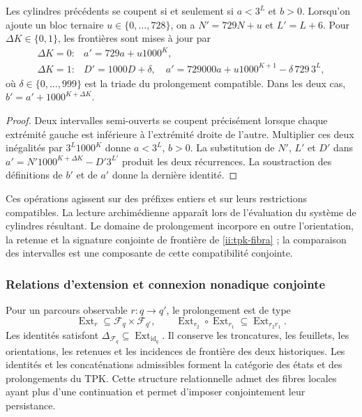 \begin{lemma}
\label{ii:tpk-cilindros-enteros}
Les cylindres précédents se coupent si et seulement si \(a<3^L\) et \(b>0\). Lorsqu'on ajoute un bloc ternaire \(u\in\{0,\ldots,728\}\), on a \(N'=729N+u\) et \(L'=L+6\). Pour \(\Delta K\in\{0,1\}\), les frontières sont mises à jour par
\[
 \begin{array}{ll}
 \Delta K=0:&a'=729a+u1000^K,\\[2pt]
 \Delta K=1:&D'=1000D+\delta,\quad
 a'=729000a+u1000^{K+1}-\delta\,729\,3^L,
 \end{array}
\]
où \(\delta\in\{0,\ldots,999\}\) est la triade du prolongement compatible. Dans les deux cas, \(b'=a'+1000^{K+\Delta K}\).
\end{lemma}
\begin{proof}
Deux intervalles semi-ouverts se coupent précisément lorsque chaque extrémité gauche est inférieure à l'extrémité droite de l'autre. Multiplier ces deux inégalités par \(3^L1000^K\) donne \(a<3^L\), \(b>0\). La substitution de \(N'\), \(L'\) et \(D'\) dans \(a'=N'1000^{K+\Delta K}-D'3^{L'}\) produit les deux récurrences. La soustraction des définitions de \(b'\) et de \(a'\) donne la dernière identité.
\end{proof}

Ces opérations agissent sur des préfixes entiers et sur leurs restrictions compatibles. La lecture archimédienne apparaît lors de l'évaluation du système de cylindres résultant. Le domaine de prolongement incorpore en outre l'orientation, la retenue et la signature conjointe de frontière de \eqref{ii:tpk-fibra} ; la comparaison des intervalles est une composante de cette compatibilité conjointe.

\subsubsection{Relations d'extension et connexion nonadique conjointe}

Pour un parcours observable \(r:q\to q'\), le prolongement est de type
\[
 \operatorname{Ext}_r\subseteq\mathcal F_q\times\mathcal F_{q'},
 \qquad
 \operatorname{Ext}_{r_2}\circ\operatorname{Ext}_{r_1}
 \subseteq\operatorname{Ext}_{r_2r_1}.
\]
Les identités satisfont \(\Delta_{\mathcal F_q}\subseteq
\operatorname{Ext}_{\operatorname{id}_q}\). Il conserve les troncatures, les feuillets, les orientations, les retenues et les incidences de frontière des deux historiques. Les identités et les concaténations admissibles forment la catégorie des états et des prolongements du TPK. Cette structure relationnelle admet des fibres locales ayant plus d'une continuation et permet d'imposer conjointement leur persistance.


